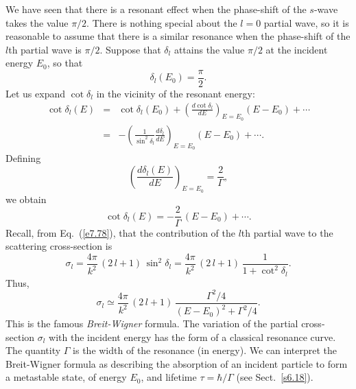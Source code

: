 We have seen that there is a resonant effect when the phase-shift of
the $s$-wave takes the value $\pi/2$.  There is nothing special about
the $l=0$ partial wave, so it is reasonable to assume that there
is a similar resonance when the phase-shift of the $l$th partial
wave is $\pi/2$. Suppose that $\delta_l$ attains the value
$\pi/2$ at the incident energy $E_0$, so that
\begin{equation}
\delta_l(E_0) = \frac{\pi}{2}.
\end{equation}
Let us expand $\cot \delta_l$ in the vicinity of the resonant energy:
\begin{eqnarray}
\cot \delta_l(E)& =& \cot \delta_l(E_0) +\left(
\frac{ d \cot\delta_l}{d E}\right)_{E=E_0}(E-E_0) + \cdots\nonumber\\[0.5ex]
&=& - \left(\frac{1}{\sin^2\delta_l}\frac{d\delta_l}{d E}\right)_{E=E_0}
(E-E_0)+\cdots.
\end{eqnarray}
Defining
\begin{equation}
\left(\frac{d \delta_l(E)}{d E} \right)_{E=E_0} = \frac{2}{\Gamma},
\end{equation}
we obtain
\begin{equation}
\cot\delta_l(E) = - \frac{2}{\Gamma} \,(E-E_0) + \cdots.
\end{equation}
Recall, from Eq.~(\ref{e7.78}), that the contribution of the $l$th partial wave
to the scattering cross-section is
\begin{equation}
\sigma_l = \frac{4\pi}{k^2} \,(2\,l+1)\,\sin^2\delta_l 
= \frac{4\pi}{k^2} \,(2\,l+1)\,\frac{1}{1+\cot^2\delta_l}.
\end{equation}
Thus,
\begin{equation}
\sigma_l \simeq \frac{4\pi}{k^2} \,(2\,l+1)\,
\frac{\Gamma^2/4}{(E-E_0)^2 + \Gamma^2/4}.
\end{equation}
This is the famous {\em Breit-Wigner} formula. The variation of
the partial cross-section $\sigma_l$ with the incident energy has
the form of a classical resonance curve. The quantity $\Gamma$ is
the width of the resonance (in energy). We can interpret the
Breit-Wigner formula as describing the absorption of an incident particle
to form a metastable state, of energy $E_0$, and lifetime $\tau = \hbar/
\Gamma$ (see Sect.~\ref{s6.18}).

